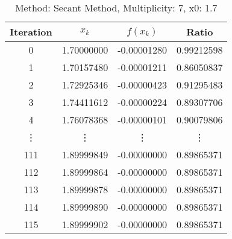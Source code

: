 \begin{table}
\centering
\caption{Method: Secant Method, Multiplicity: 7, x0: 1.7}
\label{tab:table_Secant_Method_7_1_7}
\begin{tabular}{c c c c}
\toprule
Iteration &      $x_k$ &    $f(x_k)$ &      Ratio \\
\midrule
        0 & 1.70000000 & -0.00001280 & 0.99212598 \\
        1 & 1.70157480 & -0.00001211 & 0.86050837 \\
        2 & 1.72925346 & -0.00000423 & 0.91295483 \\
        3 & 1.74411612 & -0.00000224 & 0.89307706 \\
        4 & 1.76078368 & -0.00000101 & 0.90079806 \\
   \vdots &     \vdots &      \vdots &     \vdots \\
      111 & 1.89999849 & -0.00000000 & 0.89865371 \\
      112 & 1.89999864 & -0.00000000 & 0.89865371 \\
      113 & 1.89999878 & -0.00000000 & 0.89865371 \\
      114 & 1.89999890 & -0.00000000 & 0.89865371 \\
      115 & 1.89999902 & -0.00000000 & 0.89865371 \\
\bottomrule
\end{tabular}
\end{table}
